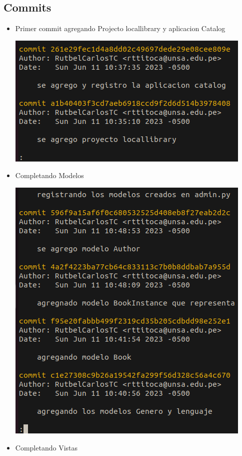 \documentclass{article}
\begin{document}
\subsection{Commits}
\begin{itemize}
	\item Primer commit agregando Projecto locallibrary y aplicacion Catalog
	\begin{center}
		\includegraphics[scale=0.4]{img/commits/project-app.png}
	\end{center}
    \item Completando Modelos
    \begin{center}
		\includegraphics[scale=0.4]{img/commits/modelos-c.png}
	\end{center}
	\item Completando Vistas

\end{itemize}
\end{document}
